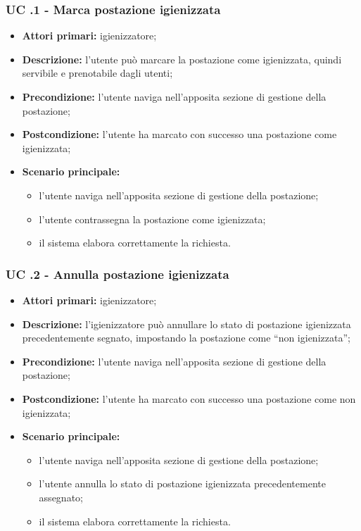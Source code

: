 \subsubsection{UC .1 - Marca postazione igienizzata}

\begin{itemize}
\item \textbf{Attori primari:} igienizzatore;
\item \textbf{Descrizione:} l'utente può marcare la postazione come igienizzata, quindi servibile e prenotabile dagli utenti;
\item \textbf{Precondizione:} l'utente naviga nell’apposita sezione di gestione della postazione; 
\item \textbf{Postcondizione:} l’utente ha marcato con successo una postazione come igienizzata;
\item \textbf{Scenario principale:} 
	\begin{itemize}
		\item l'utente naviga nell’apposita sezione di gestione della postazione;		
		\item l’utente contrassegna la postazione come igienizzata;
		\item il sistema elabora correttamente la richiesta.
	\end{itemize}
\end{itemize}

\subsubsection{UC .2 - Annulla postazione igienizzata}

\begin{itemize}
\item \textbf{Attori primari:} igienizzatore;
\item \textbf{Descrizione:} l’igienizzatore può annullare lo stato di postazione igienizzata precedentemente segnato, impostando la postazione come “non igienizzata”;
\item \textbf{Precondizione:} l'utente naviga nell’apposita sezione di gestione della postazione; 
\item \textbf{Postcondizione:} l'utente ha marcato con successo una postazione come non igienizzata;
\item \textbf{Scenario principale:} 
	\begin{itemize}
		\item l’utente naviga nell’apposita sezione di gestione della postazione;		
		\item l’utente annulla lo stato di postazione igienizzata precedentemente assegnato;
		\item il sistema elabora correttamente la richiesta.
		\end{itemize}
\end{itemize}

